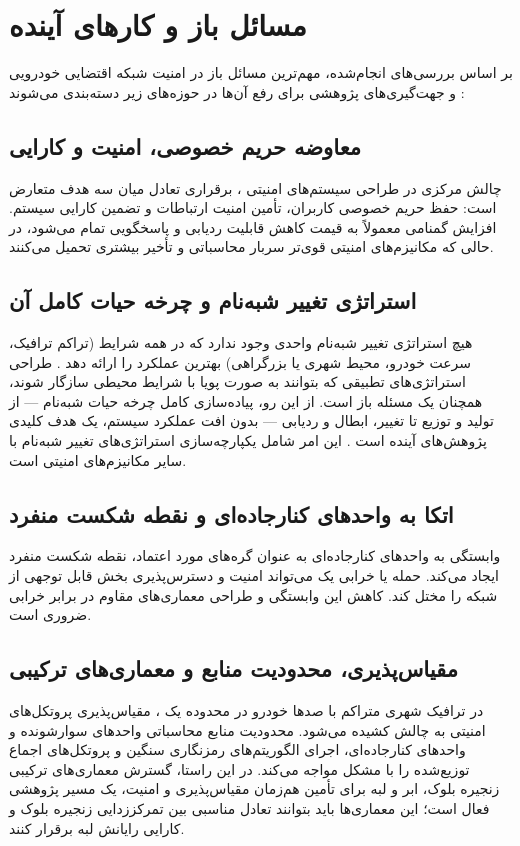 \documentclass[12pt,a4paper]{article}
\begin{document}
\section{مسائل باز و کارهای آینده}
بر اساس بررسی‌های انجام‌شده، مهم‌ترین مسائل باز در امنیت شبکه اقتضایی خودرویی و جهت‌گیری‌های پژوهشی برای رفع آن‌ها در حوزه‌های زیر دسته‌بندی می‌شوند \cite{farsimadanReviewSecurityChallenges2025, rahmawatiagustinaSystematicLiteratureReview2025}:

\subsection{معاوضه حریم خصوصی، امنیت و کارایی}
چالش مرکزی در طراحی سیستم‌های امنیتی ، برقراری تعادل میان سه هدف متعارض است: حفظ حریم خصوصی کاربران، تأمین امنیت ارتباطات و تضمین کارایی سیستم. افزایش گمنامی معمولاً به قیمت کاهش قابلیت ردیابی و پاسخگویی تمام می‌شود، در حالی که مکانیزم‌های امنیتی قوی‌تر سربار محاسباتی و تأخیر بیشتری تحمیل می‌کنند.

\subsection{استراتژی تغییر شبه‌نام و چرخه حیات کامل آن}
هیچ استراتژی تغییر شبه‌نام واحدی وجود ندارد که در همه شرایط (تراکم ترافیک، سرعت خودرو، محیط شهری یا بزرگراهی) بهترین عملکرد را ارائه دهد \cite{rahmawatiagustinaSystematicLiteratureReview2025}. طراحی استراتژی‌های تطبیقی که بتوانند به صورت پویا با شرایط محیطی سازگار شوند، همچنان یک مسئله باز است. از این رو، پیاده‌سازی کامل چرخه حیات شبه‌نام — از تولید و توزیع تا تغییر، ابطال و ردیابی — بدون افت عملکرد سیستم، یک هدف کلیدی پژوهش‌های آینده است \cite{rahmawatiagustinaSystematicLiteratureReview2025}. این امر شامل یکپارچه‌سازی استراتژی‌های تغییر شبه‌نام با سایر مکانیزم‌های امنیتی است.

\subsection{اتکا به واحدهای کنارجاده‌ای و نقطه شکست منفرد}
وابستگی به واحدهای کنارجاده‌ای به عنوان گره‌های مورد اعتماد، نقطه شکست منفرد ایجاد می‌کند. حمله یا خرابی یک  می‌تواند امنیت و دسترس‌پذیری بخش قابل توجهی از شبکه را مختل کند. کاهش این وابستگی و طراحی معماری‌های مقاوم در برابر خرابی  ضروری است.

\subsection{مقیاس‌پذیری، محدودیت منابع و معماری‌های ترکیبی}
در ترافیک شهری متراکم با صدها خودرو در محدوده یک ، مقیاس‌پذیری پروتکل‌های امنیتی به چالش کشیده می‌شود. محدودیت منابع محاسباتی واحدهای سوارشونده و واحدهای کنارجاده‌ای، اجرای الگوریتم‌های رمزنگاری سنگین و پروتکل‌های اجماع توزیع‌شده را با مشکل مواجه می‌کند. در این راستا، گسترش معماری‌های ترکیبی زنجیره بلوک، ابر و لبه برای تأمین هم‌زمان مقیاس‌پذیری و امنیت، یک مسیر پژوهشی فعال است؛ این معماری‌ها باید بتوانند تعادل مناسبی بین تمرکززدایی زنجیره بلوک و کارایی رایانش لبه برقرار کنند.
\end{document}
